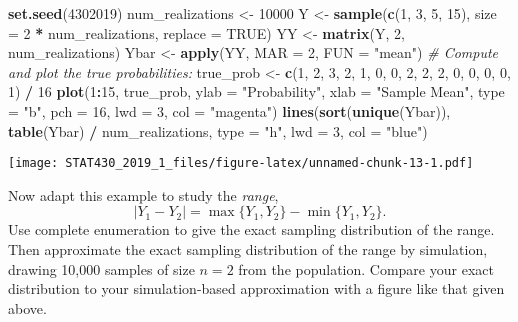 \documentclass[]{article}
\newenvironment{Shaded}{\begin{snugshade}}{\end{snugshade}}
\newcommand{\KeywordTok}[1]{\textcolor[rgb]{0.13,0.29,0.53}{\textbf{#1}}}
\newcommand{\DataTypeTok}[1]{\textcolor[rgb]{0.13,0.29,0.53}{#1}}
\newcommand{\DecValTok}[1]{\textcolor[rgb]{0.00,0.00,0.81}{#1}}
\newcommand{\StringTok}[1]{\textcolor[rgb]{0.31,0.60,0.02}{#1}}
\newcommand{\CommentTok}[1]{\textcolor[rgb]{0.56,0.35,0.01}{\textit{#1}}}
\newcommand{\OtherTok}[1]{\textcolor[rgb]{0.56,0.35,0.01}{#1}}
\newcommand{\OperatorTok}[1]{\textcolor[rgb]{0.81,0.36,0.00}{\textbf{#1}}}
\newcommand{\NormalTok}[1]{#1}
\begin{document}
\begin{Shaded}
\begin{Highlighting}[]
\KeywordTok{set.seed}\NormalTok{(}\DecValTok{4302019}\NormalTok{)}
\NormalTok{num_realizations <-}\StringTok{ }\DecValTok{10000}
\NormalTok{Y <-}\StringTok{ }\KeywordTok{sample}\NormalTok{(}\KeywordTok{c}\NormalTok{(}\DecValTok{1}\NormalTok{, }\DecValTok{3}\NormalTok{, }\DecValTok{5}\NormalTok{, }\DecValTok{15}\NormalTok{), }\DataTypeTok{size =} \DecValTok{2} \OperatorTok{*}\StringTok{ }\NormalTok{num_realizations, }\DataTypeTok{replace =} \OtherTok{TRUE}\NormalTok{)}
\NormalTok{YY <-}\StringTok{ }\KeywordTok{matrix}\NormalTok{(Y, }\DecValTok{2}\NormalTok{, num_realizations)}
\NormalTok{Ybar <-}\StringTok{ }\KeywordTok{apply}\NormalTok{(YY, }\DataTypeTok{MAR =} \DecValTok{2}\NormalTok{, }\DataTypeTok{FUN =} \StringTok{"mean"}\NormalTok{)}
\CommentTok{# Compute and plot the true probabilities: }
\NormalTok{true_prob <-}\StringTok{ }\KeywordTok{c}\NormalTok{(}\DecValTok{1}\NormalTok{, }\DecValTok{2}\NormalTok{, }\DecValTok{3}\NormalTok{, }\DecValTok{2}\NormalTok{, }\DecValTok{1}\NormalTok{, }\DecValTok{0}\NormalTok{, }\DecValTok{0}\NormalTok{, }\DecValTok{2}\NormalTok{, }\DecValTok{2}\NormalTok{, }\DecValTok{2}\NormalTok{, }\DecValTok{0}\NormalTok{, }\DecValTok{0}\NormalTok{, }\DecValTok{0}\NormalTok{, }\DecValTok{0}\NormalTok{, }\DecValTok{1}\NormalTok{) }\OperatorTok{/}\StringTok{ }\DecValTok{16}
\KeywordTok{plot}\NormalTok{(}\DecValTok{1}\OperatorTok{:}\DecValTok{15}\NormalTok{, true_prob, }
     \DataTypeTok{ylab =} \StringTok{"Probability"}\NormalTok{,}
     \DataTypeTok{xlab =} \StringTok{"Sample Mean"}\NormalTok{,}
     \DataTypeTok{type =} \StringTok{"b"}\NormalTok{, }\DataTypeTok{pch =} \DecValTok{16}\NormalTok{, }\DataTypeTok{lwd =} \DecValTok{3}\NormalTok{, }\DataTypeTok{col =} \StringTok{"magenta"}\NormalTok{)}
\KeywordTok{lines}\NormalTok{(}\KeywordTok{sort}\NormalTok{(}\KeywordTok{unique}\NormalTok{(Ybar)), }\KeywordTok{table}\NormalTok{(Ybar) }\OperatorTok{/}\StringTok{ }\NormalTok{num_realizations, }\DataTypeTok{type =} \StringTok{"h"}\NormalTok{, }\DataTypeTok{lwd =} \DecValTok{3}\NormalTok{, }\DataTypeTok{col =} \StringTok{"blue"}\NormalTok{)}
\end{Highlighting}
\end{Shaded}

\texttt{[image: STAT430\_2019\_1\_files/figure-latex/unnamed-chunk-13-1.pdf]}

Now adapt this example to study the \emph{range}, \[
|Y_1-Y_2|=\max\{Y_1, Y_2\} - \min\{Y_1,Y_2\}.
\] Use complete enumeration to give the exact sampling distribution of
the range. Then approximate the exact sampling distribution of the range
by simulation, drawing 10,000 samples of size \(n=2\) from the
population. Compare your exact distribution to your simulation-based
approximation with a figure like that given above.
\end{document}
